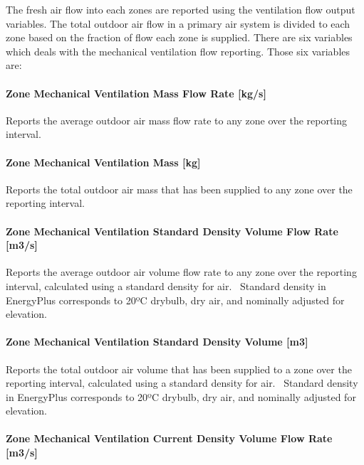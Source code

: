 The fresh air flow into each zones are reported using the ventilation flow output variables. The total outdoor air flow in a primary air system is divided to each zone based on the fraction of flow each zone is supplied. There are six variables which deals with the mechanical ventilation flow reporting. Those six variables are:

\paragraph{Zone Mechanical Ventilation Mass Flow Rate {[}kg/s{]}}\label{zone-mechanical-ventilation-mass-flow-rate-kgs}

Reports the average outdoor air mass flow rate to any zone over the reporting interval.

\paragraph{Zone Mechanical Ventilation Mass {[}kg{]}}\label{zone-mechanical-ventilation-mass-kg}

Reports the total outdoor air mass that has been supplied to any zone over the reporting interval.

\paragraph{Zone Mechanical Ventilation Standard Density Volume Flow Rate {[}m3/s{]}}\label{zone-mechanical-ventilation-standard-density-volume-flow-rate-m3s}

Reports the average outdoor air volume flow rate to any zone over the reporting interval, calculated using a standard density for air.~ Standard density in EnergyPlus corresponds to 20ºC drybulb, dry air, and nominally adjusted for elevation.

\paragraph{Zone Mechanical Ventilation Standard Density Volume {[}m3{]}}\label{zone-mechanical-ventilation-standard-density-volume-m3}

Reports the total outdoor air volume that has been supplied to a zone over the reporting interval, calculated using a standard density for air.~ Standard density in EnergyPlus corresponds to 20ºC drybulb, dry air, and nominally adjusted for elevation.

\paragraph{Zone Mechanical Ventilation Current Density Volume Flow Rate {[}m3/s{]}}\label{zone-mechanical-ventilation-current-density-volume-flow-rate-m3s}


